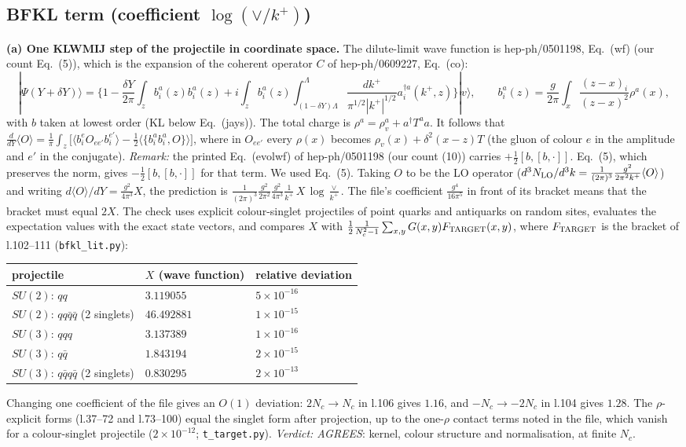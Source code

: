 \subsection{BFKL term (coefficient $\log(\vee/k^+)$)}
\textbf{(a) One KLWMIJ step of the projectile in coordinate space.} The dilute-limit wave function is hep-ph/0501198, Eq.~(wf) (our count Eq.~(5)), which is the expansion of the coherent operator $C$ of hep-ph/0609227, Eq.~(co):
\[
|\Psi(Y+\delta Y)\rangle=\Big\{1-\frac{\delta Y}{2\pi}\int_z b^a_i(z)b^a_i(z)+i\int_zb^a_i(z)\int_{(1-\delta Y)\Lambda}^{\Lambda}\frac{dk^+}{\pi^{1/2}|k^+|^{1/2}}a^{\dagger a}_i(k^+,z)\Big\}|v\rangle,\qquad
b^a_i(z)=\frac{g}{2\pi}\int_x\frac{(z-x)_i}{(z-x)^2}\rho^a(x),
\]
with $b$ taken at lowest order (KL below Eq.~(jays)). The total charge is $\rho^a=\rho^a_v+a^\dagger T^a a$. It follows that
$\frac{d}{dY}\langle O\rangle=\frac1\pi\int_z\big[\langle b^e_iO_{ee'}b^{e'}_i\rangle-\tfrac12\langle\{b_i^ab_i^a,O\}\rangle\big]$, where in $O_{ee'}$ every $\rho(x)$ becomes $\rho_v(x)+\delta^2(x-z)T$ (the gluon of colour $e$ in the amplitude and $e'$ in the conjugate).
\emph{Remark:} the printed Eq.~(evolwf) of hep-ph/0501198 (our count (10)) carries $+\frac12[b,[b,\cdot]]$. Eq.~(5), which preserves the norm, gives $-\frac12[b,[b,\cdot]]$ for that term. We used Eq.~(5).
Taking $O$ to be the LO operator ($d^3N_{\rm LO}/d^3k=\frac{1}{(2\pi)^3}\frac{g^2}{2\pi^2k^+}\langle O\rangle$) and writing $d\langle O\rangle/dY=\frac{g^2}{4\pi^3}X$, the prediction is
$\frac{1}{(2\pi)^3}\frac{g^2}{2\pi^2}\frac{g^2}{4\pi^3}\frac{1}{k^+}\,X\,\log\frac{\vee}{k^+}$. The file's coefficient $\frac{g^4}{16\pi^5}$ in front of its bracket means that the bracket must equal $2X$.
The check uses explicit colour-singlet projectiles of point quarks and antiquarks on random sites, evaluates the expectation values with the exact state vectors, and compares $X$ with $\frac12\frac{1}{N_c^2-1}\sum_{x,y}G(x,y)F_{\rm TARGET}(x,y)$, where $F_{\rm TARGET}$ is the bracket of l.102--111 (\texttt{bfkl\_lit.py}):
\begin{center}
\begin{tabular}{lll}
projectile & $X$ (wave function) & relative deviation\\\hline
$SU(2)$: $qq$ & $3.119055$ & $5\times10^{-16}$\\
$SU(2)$: $qq\bar q\bar q$ (2 singlets) & $46.492881$ & $1\times10^{-15}$\\
$SU(3)$: $qqq$ & $3.137389$ & $1\times10^{-16}$\\
$SU(3)$: $q\bar q$ & $1.843194$ & $2\times10^{-15}$\\
$SU(3)$: $q\bar qq\bar q$ (2 singlets) & $0.830295$ & $2\times10^{-13}$
\end{tabular}
\end{center}
Changing one coefficient of the file gives an $O(1)$ deviation: $2N_c\to N_c$ in l.106 gives $1.16$, and $-N_c\to-2N_c$ in l.104 gives $1.28$. The $\rho$-explicit forms (l.37--72 and l.73--100) equal the singlet form after projection, up to the one-$\rho$ contact terms noted in the file, which vanish for a colour-singlet projectile ($2\times10^{-12}$; \texttt{t\_target.py}).
\emph{Verdict: AGREES}: kernel, colour structure and normalisation, at finite $N_c$.

